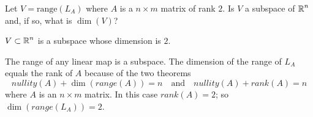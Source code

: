 \documentclass{ximera}
\author{Marty Golubitsky}
\begin{document}

\begin{exercise}\label{new_8_2_1}

Let $V = \mbox{range}(L_A)$ where $A$ is a $n\times m$ matrix of rank $2$.  Is $V$ a subspace of $\mbox{$\mathbb{R}$}^n$ and, if so, what is $\dim(V)$? 
  
\begin{solution}

\ans 
$V\subset\mbox{$\mathbb{R}$}^n$ is a subspace whose dimension is $2$.

\soln 
The range of any linear map is a subspace.  The dimension of the range of $L_A$ equals the rank of $A$ because of the two theorems 
\[
nullity(A) + \dim(range(A)) = n  \quad\mbox{and} \quad nullity(A) + rank(A) = n 
\]
where $A$ is an $n\times m$ matrix.  In this case $rank(A) = 2$; so $\dim(range(L_A)) = 2$. 

\end{solution}
\end{exercise}
\end{document}
